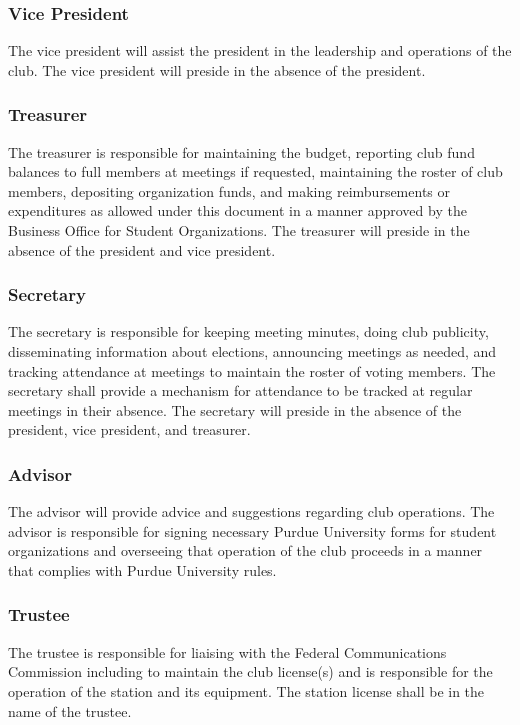 \documentclass{article}
\begin{document}
\subsubsection{Vice President}

The vice president will assist the president in the leadership and operations of
the club. The vice president will preside in the absence of the president.

\subsubsection{Treasurer}

The treasurer is responsible for maintaining the budget, reporting club fund
balances to full members at meetings if requested, maintaining the roster of
club members, depositing organization funds, and making reimbursements or
expenditures as allowed under this document in a manner approved by the Business
Office for Student Organizations. The treasurer will preside in the absence of
the president and vice president.

\subsubsection{Secretary}

The secretary is responsible for keeping meeting minutes, doing club publicity,
disseminating information about elections, announcing meetings as needed, and
tracking attendance at meetings to maintain the roster of voting members. The
secretary shall provide a mechanism for attendance to be tracked at regular
meetings in their absence. The secretary will preside in the absence of the
president, vice president, and treasurer.

\subsubsection{Advisor}

The advisor will provide advice and suggestions regarding club operations. The
advisor is responsible for signing necessary Purdue University forms for student
organizations and overseeing that operation of the club proceeds in a manner
that complies with Purdue University rules.

\subsubsection{Trustee}

The trustee is responsible for liaising with the Federal Communications
Commission including to maintain the club license(s) and is responsible for the
operation of the station and its equipment. The station license shall be in the
name of the trustee.
\end{document}
